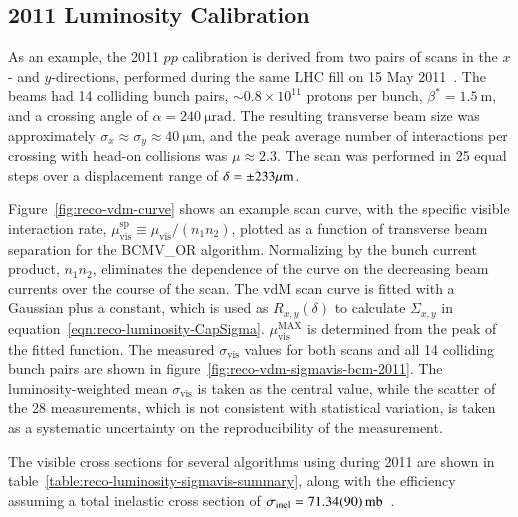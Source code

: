 \subsection{2011 Luminosity Calibration}

As an example, the 2011 $pp$ calibration is derived from two pairs of scans in the $x$- and $y$-directions, performed during the same LHC fill on 15 May 2011~\cite{Aad:2013ucp}. The beams had 14 colliding bunch pairs, $\sim0.8\times 10^{11}$ protons per bunch, $\beta^*=\SI{1.5}{\meter}$, and a crossing angle of $\alpha=\SI{240}{\micro\radian}$. The resulting transverse beam size was approximately $\sigma_{x}\approx\sigma_{y}\approx \SI{40}{\micro\meter}$, and the peak average number of interactions per crossing with head-on collisions was $\mu\approx 2.3$. The scan was performed in 25 equal steps over a displacement range of $\delta=\pm 233 \mu\mathrm{m}$.

Figure~\ref{fig:reco-vdm-curve} shows an example scan curve, with the specific visible interaction rate, $\mu_{\mathrm{vis}}^{\mathrm{sp}}\equiv \mu_{\mathrm{vis}}/(n_1n_2)$, plotted as a function of transverse beam separation for the BCMV\_OR algorithm. Normalizing by the bunch current product, $n_1n_2$, eliminates the dependence of the curve on the decreasing beam currents over the course of the scan. The vdM scan curve is fitted with a Gaussian plus a constant, which is used as $R_{x,y}(\delta)$ to calculate $\Sigma_{x,y}$ in equation~\ref{eqn:reco-luminosity-CapSigma}. $\mu_{\mathrm{vis}}^{\mathrm{MAX}}$ is determined from the peak of the fitted function. The measured $\sigma_{\mathrm{vis}}$ values for both scans and all 14 colliding bunch pairs are shown in figure~\ref{fig:reco-vdm-sigmavis-bcm-2011}. The luminosity-weighted mean $\sigma_{\mathrm{vis}}$ is taken as the central value, while the scatter of the 28 measurements, which is not consistent with statistical variation, is taken as a systematic uncertainty on the reproducibility of the measurement. 

The visible cross sections for several algorithms using during 2011 are shown in table~\ref{table:reco-luminosity-sigmavis-summary}, along with the efficiency assuming a total inelastic cross section of $\sigma_{\mathrm{inel}}= \SI{71.34\pm0.9}{\milli\barn}$~\cite{TheATLASCollaboration:2014jo}.

